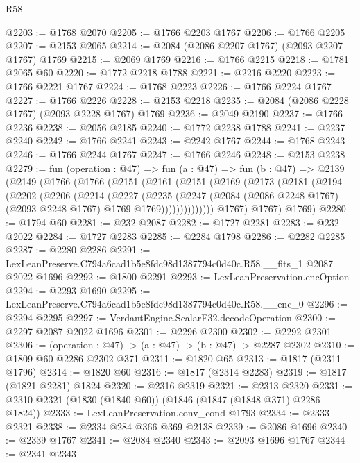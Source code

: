 \begin{lexlean}{R58}
\begin{coremodule}
@2203 := @1768 @2070
@2205 := @1766 @2203 @1767
@2206 := @1766 @2205
@2207 := @2153 @2065
@2214 := @2084 (@2086 @2207 @1767) (@2093 @2207 @1767) @1769
@2215 := @2069 @1769
@2216 := @1766 @2215
@2218 := @1781 @2065 @60
@2220 := @1772 @2218 @1788
@2221 := @2216 @2220
@2223 := @1766 @2221 @1767
@2224 := @1768 @2223
@2226 := @1766 @2224 @1767
@2227 := @1766 @2226
@2228 := @2153 @2218
@2235 := @2084 (@2086 @2228 @1767) (@2093 @2228 @1767) @1769
@2236 := @2049 @2190
@2237 := @1766 @2236
@2238 := @2056 @2185
@2240 := @1772 @2238 @1788
@2241 := @2237 @2240
@2242 := @1766 @2241
@2243 := @2242 @1767
@2244 := @1768 @2243
@2246 := @1766 @2244 @1767
@2247 := @1766 @2246
@2248 := @2153 @2238
@2279 := fun (operation : @47) =>
  fun (a : @47) =>
  fun (b : @47) =>
  @2139
    (@2149
      (@1766
        (@1766
          (@2151
            (@2161
              (@2151
                (@2169
                  (@2173
                    (@2181
                      (@2194
                        (@2202
                          (@2206
                            (@2214
                              (@2227
                                (@2235
                                  (@2247
                                    (@2084
                                      (@2086 @2248 @1767)
                                      (@2093 @2248 @1767)
                                      @1769
                                      @1769))))))))))))))
          @1767)
        @1767)
      @1769)
@2280 := @1794 @60
@2281 := @232 @2087
@2282 := @1727 @2281
@2283 := @232 @2022
@2284 := @1727 @2283
@2285 := @2284 @1798
@2286 := @2282 @2285
@2287 := @2280 @2286
@2291 := LexLeanPreserve.C794a6cad1b5e8fdc98d1387794c0d40c.R58.__fits_1 @2087 @2022 @1696
@2292 := @1800 @2291
@2293 := LexLeanPreservation.encOption
@2294 := @2293 @1690
@2295 := LexLeanPreserve.C794a6cad1b5e8fdc98d1387794c0d40c.R58.__enc_0
@2296 := @2294 @2295
@2297 := VerdantEngine.ScalarF32.decodeOperation
@2300 := @2297 @2087 @2022 @1696
@2301 := @2296 @2300
@2302 := @2292 @2301
@2306 := (operation : @47) -> (a : @47) -> (b : @47) -> @2287 @2302
@2310 := @1809 @60 @2286 @2302 @371
@2311 := @1820 @65
@2313 := @1817 (@2311 @1796)
@2314 := @1820 @60
@2316 := @1817 (@2314 @2283)
@2319 := @1817 (@1821 @2281) @1824
@2320 := @2316 @2319
@2321 := @2313 @2320
@2331 := @2310 @2321 (@1830 (@1840 @60)) (@1846 (@1847 (@1848 @371) @2286 @1824))
@2333 := LexLeanPreservation.conv_cond @1793
@2334 := @2333 @2321
@2338 := @2334 @284 @366 @369 @2138
@2339 := @2086 @1696
@2340 := @2339 @1767
@2341 := @2084 @2340
@2343 := @2093 @1696 @1767
@2344 := @2341 @2343

\end{coremodule}
\end{lexlean}
